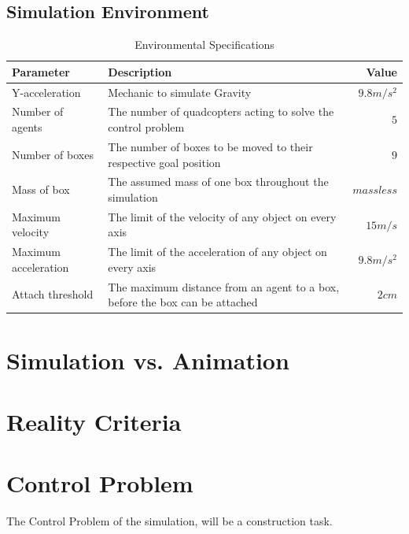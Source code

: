 \subsection{Simulation Environment}
\label{sec:environment}
\begin{table}[]
\centering
\begin{tabularx}{1\textwidth}{l@{}Xr}
\toprule
\textbf{Parameter}   & \textbf{Description}                                                        & \textbf{Value} \\ \midrule
Y-acceleration       & Mechanic to simulate Gravity                                                & ${9.8m/s^2}$  \\
Number of agents     & The number of quadcopters acting to solve the control problem               & ${5}$          \\
Number of boxes      & The number of boxes to be moved to their respective goal position           & ${9}$              \\
Mass of box          & The assumed mass of one box throughout the simulation                       & ${massless}$       \\
Maximum velocity     & The limit of the velocity of any object on every axis                       & ${15m/s}$         \\
Maximum acceleration & The limit of the acceleration of any object on every axis                   & ${9.8m/s^2}$       \\
Attach threshold     & The maximum distance from an agent to a box, before the box can be attached & ${2cm}$           \\ \bottomrule
\end{tabularx}
\caption{Environmental Specifications}
\label{tab:env_specs}
\end{table}

\section{Simulation vs. Animation}
\label{sec:simulation_animation}


\section{Reality Criteria}
\label{sec:reality}

\section{Control Problem}
\label{sec:control_problem}
The Control Problem of the simulation, will be a construction task. 

